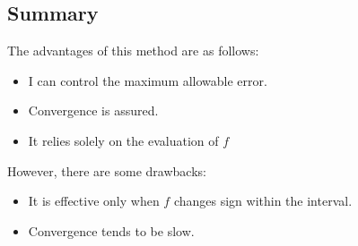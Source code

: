 \subsection*{Summary}
The advantages of this method are as follows:
\begin{itemize}
    \item I can control the maximum allowable error.
    \item Convergence is assured.
    \item It relies solely on the evaluation of $f$
\end{itemize}
However, there are some drawbacks:
\begin{itemize}
    \item It is effective only when $f$ changes sign within the interval.
    \item Convergence tends to be slow.
\end{itemize}